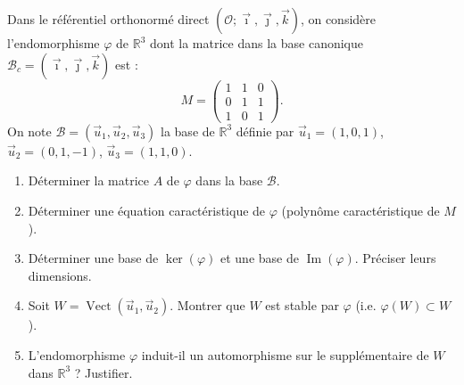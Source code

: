 \documentclass[11pt]{article}
\begin{document}
\begin{exercice}
Dans le référentiel orthonormé direct $(\mathcal{O}; \vec{\imath}, \vec{\jmath}, \vec{k})$, on considère l'endomorphisme $\varphi$ de $\mathbb{R}^3$ dont la matrice dans la base canonique $\mathcal{B}_c = (\vec{\imath}, \vec{\jmath}, \vec{k})$ est :
\[
M = \begin{pmatrix}
1 & 1 & 0 \\
0 & 1 & 1 \\
1 & 0 & 1
\end{pmatrix}.
\]
On note $\mathcal{B} = (\vec{u}_1, \vec{u}_2, \vec{u}_3)$ la base de $\mathbb{R}^3$ définie par $\vec{u}_1 = (1, 0, 1)$, $\vec{u}_2 = (0, 1, -1)$, $\vec{u}_3 = (1, 1, 0)$.

\begin{enumerate}
    \item Déterminer la matrice $A$ de $\varphi$ dans la base $\mathcal{B}$.
    \item Déterminer une équation caractéristique de $\varphi$ (polynôme caractéristique de $M$).
    \item Déterminer une base de $\ker(\varphi)$ et une base de $\operatorname{Im}(\varphi)$. Préciser leurs dimensions.
    \item Soit $W = \operatorname{Vect}(\vec{u}_1, \vec{u}_2)$. Montrer que $W$ est stable par $\varphi$ (i.e. $\varphi(W) \subset W$).
    \item L'endomorphisme $\varphi$ induit-il un automorphisme sur le supplémentaire de $W$ dans $\mathbb{R}^3$ ? Justifier.
\end{enumerate}
\end{exercice}
\end{document}

